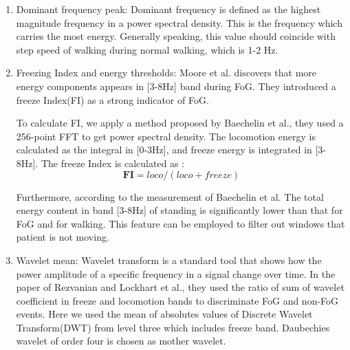 \documentclass[article]{article}
\begin{document}
	\begin{enumerate}
		\item Dominant frequency peak: Dominant frequency is defined as the highest magnitude frequency in a power spectral density. This is the frequency which carries the most energy. Generally speaking, this value should coincide with step speed of walking during normal walking, which is 1-2 Hz. 
	
		\item Freezing Index and energy thresholds: Moore et al. discovers that more energy components appears
			in [3-8Hz] band during FoG. They introduced a freeze Index(FI) as a strong indicator of FoG.
			
			To calculate FI, we apply a method proposed by Baechelin et al., they used a 256-point FFT to get power spectral density. The locomotion energy is calculated as the integral in [0-3Hz], and freeze energy is integrated in [3-8Hz]. The freeze Index is calculated as :
			\begin{equation}
			\mathbf{FI} = loco/(loco+freeze)
			\end{equation}			
			
			Furthermore, according to the measurement of Baechelin et al. The total energy content in band [3-8Hz] of standing is significantly lower than that for FoG and for walking. This feature can be employed to filter out windows that patient is not moving.
			  

	
		\item Wavelet mean: Wavelet transform is a standard tool that shows how the power amplitude of a specific frequency in a signal change over time. In the paper of Rezvanian and Lockhart et al., they used the ratio of sum of wavelet coefficient in freeze and locomotion bands to discriminate FoG and non-FoG events. Here we used the mean of absolutes values of Discrete Wavelet Transform(DWT) from level three which includes freeze band. Daubechies wavelet of order four is chosen as mother wavelet. 
	
	\end{enumerate} 
\end{document}
